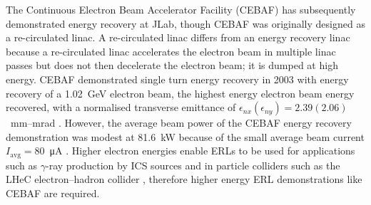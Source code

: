 \documentclass[../main.tex]{subfiles}
\begin{document}
The Continuous Electron Beam Accelerator Facility (CEBAF) \cite{bogacz2003cebaf,tennant2003beam} has subsequently demonstrated energy recovery at JLab, though CEBAF was originally designed as a re-circulated linac. A re-circulated linac differs from an energy recovery linac because a re-circulated linac accelerates the electron beam in multiple linac passes but does not then decelerate the electron beam; it is dumped at high energy. CEBAF demonstrated single turn energy recovery in 2003 \cite{bogacz2003cebaf,tennant2003beam} with energy recovery of a 1.02~\si{\giga\electronvolt} electron beam, the highest energy electron beam energy recovered, with a normalised transverse emittance of $\epsilon_{nx} \left(\epsilon_{ny}\right) = 2.39 \left(2.06\right)$~\si{\milli\meter}--\si{\milli\radian} \cite{tennant2003beam}. However, the average beam power of the CEBAF energy recovery demonstration was modest at 81.6~\si{\kilo\watt} because of the small average beam current $I_{\mathrm{avg}} = 80$~\si{\micro\ampere} \cite{freyberger2004cebaf}. Higher electron energies enable ERLs to be used for applications such as $\gamma$-ray production by ICS sources\cite{budker2021expanding} and in particle colliders such as the LHeC electron--hadron collider \cite{agostini2021large}, therefore higher energy ERL demonstrations like CEBAF are required.   
\end{document}
